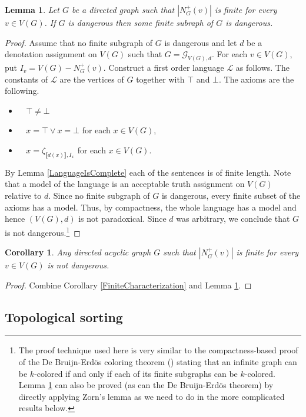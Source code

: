 \documentclass[12pt]{kluwer}
\newtheorem{lem}[thm]{Lemma}
\newtheorem{cor}[thm]{Corollary}
\theoremstyle{remark}
\newcommand{\fancy}[1]{\mathcal{#1}}
\def\L{\fancy{L}}
\def\G{\fancy{G}}
\begin{document}
\begin{lem}\label{LocalFinite}
Let $G$ be a directed graph such that $|N^{+}_G(v)|$ is finite for every $v \in V(G)$.  If $G$ is dangerous then some finite subraph of $G$ is dangerous.
\end{lem}
\begin{proof}
Assume that no finite subgraph of $G$ is dangerous and let $d$ be a denotation assignment on $V(G)$ such that $G = \G_{V(G), d}$.  For each $v \in V(G)$, put $I_v = V(G) - N^+_G(v)$. Construct a first order language $\fancy{L}$ as follows.  The constants of $\L$ are the vertices of $G$ together with $\top$ and $\bot$.  The axioms are the following.

\begin{itemize}
\item $\;\;$ $\top \neq \bot$
\item $\;\;$ $x = \top \vee x = \bot$ for each $x \in V(G)$,
\item $\;\;$ $x = \zeta_{\llbracket d(x) \rrbracket, I_x}$ for each $x \in V(G)$.
\end{itemize}

By Lemma \ref{LanguageIsComplete} each of the sentences is of finite length.  Note that a model of the language is an acceptable truth assignment on $V(G)$ relative to $d$.  Since no finite subgraph of $G$ is dangerous, every finite subset of the axioms has a model.  Thus, by compactness, the whole language has a model and hence $(V(G), d)$ is not paradoxical.  Since $d$ was arbitrary, we conclude that $G$ is not dangerous.\footnote{The proof technique used here is very similar to the compactness-based proof of the De Bruijn-Erd{\"o}s coloring theorem (\cite{erdos51}) stating that an infinite graph can be $k$-colored if and only if each of its finite subgraphs can be $k$-colored.  Lemma \ref{LocalFinite} can also be proved (as can the De Bruijn-Erd{\"o}s theorem) by directly applying Zorn's lemma as we need to do in the more complicated results below.}
\end{proof}

\begin{cor}\label{AtLeastOneInfinite}
Any directed acyclic graph $G$ such that $|N^{+}_G(v)|$ is finite for every $v \in V(G)$ is not dangerous.
\end{cor}
\begin{proof}
Combine Corollary \ref{FiniteCharacterization} and Lemma \ref{LocalFinite}.
\end{proof}

\subsection{Topological sorting}
\end{document}
